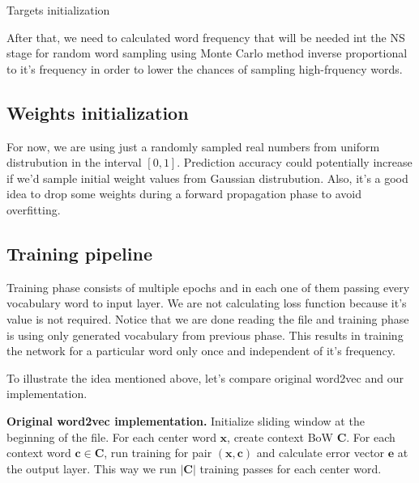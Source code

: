 \documentclass{article}
\newcommand{\SetAlgoStyle}{
	\SetAlgoNoLine
	\SetAlgoNoEnd
	\DontPrintSemicolon
}
\begin{document}
\begin{algorithm}[H]
	\caption{Targets initialization}
	\SetAlgoStyle
\end{algorithm}

\medbreak

After that, we need to calculated word frequency that will be needed
int the NS stage for random word sampling using Monte Carlo method inverse
proportional to it's frequency in order to lower the chances of sampling
high-frquency words.

\subsection{Weights initialization}

For now, we are using just a randomly sampled real numbers from uniform distrubution in the interval
$[0, 1]$. Prediction accuracy could potentially increase if we'd sample initial
weight values from Gaussian distrubution. Also, it's a good idea to drop
some weights during a forward propagation phase to avoid overfitting.

\subsection{Training pipeline}

Training phase consists of multiple epochs and in each one of them passing
every vocabulary word to input layer. We are not calculating loss function
because it's value is not required. Notice that we are done reading the file
and training phase is using only generated vocabulary from previous phase.
This results in training the network for a particular word only once and
independent of it's frequency.

\medbreak

To illustrate the idea mentioned above, let's compare original word2vec and our implementation.

\textbf{Original word2vec implementation.}
Initialize sliding window at the beginning of the file. For each center word $\boldsymbol{x}$, create context BoW $\boldsymbol{C}$. For each context word $\boldsymbol{c} \in \boldsymbol{C}$, run training for pair $(\boldsymbol{x}, \boldsymbol{c})$ and calculate error vector $\boldsymbol{e}$ at the output layer. This way we run $|\boldsymbol{C}|$ training passes for each center word.
\end{document}
